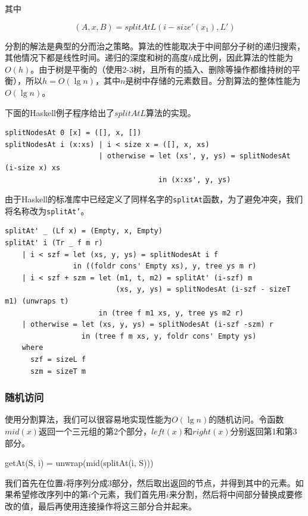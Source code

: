 \documentclass[b5paper]{ctexart}
\begin{document}
其中

\[
(A, x, B) = splitAtL(i-size'(x_1), L')
\]

分割的解法是典型的分而治之策略。算法的性能取决于中间部分子树的递归搜索，其他情况下都是线性时间。递归的深度和树的高度$h$成比例，因此算法的性能为$O(h)$。由于树是平衡的（使用2-3树，且所有的插入、删除等操作都维持树的平衡），所以$h = O(\lg n)$，其中$n$是树中存储的元素数目。分割算法的整体性能为$O(\lg n)$。

下面的Haskell例子程序给出了$splitAtL$算法的实现。

\lstset{language=Haskell}
\begin{lstlisting}[style=Haskell]
splitNodesAt 0 [x] = ([], x, [])
splitNodesAt i (x:xs) | i < size x = ([], x, xs)
                      | otherwise = let (xs', y, ys) = splitNodesAt (i-size x) xs
                                    in (x:xs', y, ys)
\end{lstlisting}

由于Haskell的标准库中已经定义了同样名字的\texttt{splitAt}函数，为了避免冲突，我们将名称改为\texttt{splitAt'}。

\begin{lstlisting}[style=Haskell]
splitAt' _ (Lf x) = (Empty, x, Empty)
splitAt' i (Tr _ f m r)
    | i < szf = let (xs, y, ys) = splitNodesAt i f
                in ((foldr cons' Empty xs), y, tree ys m r)
    | i < szf + szm = let (m1, t, m2) = splitAt' (i-szf) m
                          (xs, y, ys) = splitNodesAt (i-szf - sizeT m1) (unwraps t)
                      in (tree f m1 xs, y, tree ys m2 r)
    | otherwise = let (xs, y, ys) = splitNodesAt (i-szf -szm) r
                  in (tree f m xs, y, foldr cons' Empty ys)
    where
      szf = sizeL f
      szm = sizeT m
\end{lstlisting}

\subsubsection{随机访问}

使用分割算法，我们可以很容易地实现性能为$O(\lg n)$的随机访问。令函数$mid(x)$返回一个三元组的第2个部分，$left(x)$和$right(x)$分别返回第1和第3部分。

\be
getAt(S, i) = unwrap(mid(splitAt(i, S)))
\ee

我们首先在位置$i$将序列分成3部分，然后取出返回的节点，并得到其中的元素。如果希望修改序列中的第$i$个元素，我们首先用$i$来分割，然后将中间部分替换成要修改的值，最后再使用连接操作将这三部分合并起来。
\end{document}
